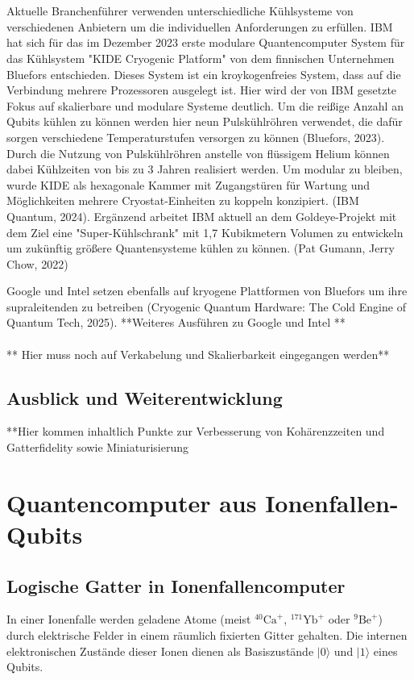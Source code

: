 \\\\
Aktuelle Branchenführer verwenden unterschiedliche Kühlsysteme von verschiedenen Anbietern um die individuellen Anforderungen zu erfüllen. IBM hat sich für das im Dezember 2023 erste modulare Quantencomputer System für das Kühlsystem "KIDE Cryogenic Platform" von dem finnischen Unternehmen Bluefors entschieden. Dieses System ist ein kroykogenfreies System, dass auf die Verbindung mehrere Prozessoren ausgelegt ist. Hier wird der von IBM gesetzte Fokus auf skalierbare und modulare Systeme deutlich. Um die reißige Anzahl an Qubits kühlen zu können werden hier neun Pulskühlröhren verwendet, die dafür sorgen verschiedene Temperaturstufen versorgen zu können (Bluefors, 2023). Durch die Nutzung von Pulskühlröhren anstelle von flüssigem Helium können dabei Kühlzeiten von bis zu 3 Jahren realisiert werden. Um modular zu bleiben, wurde KIDE als hexagonale Kammer mit Zugangstüren für Wartung und Möglichkeiten mehrere Cryostat-Einheiten zu koppeln konzipiert. (IBM Quantum, 2024). Ergänzend arbeitet IBM aktuell an dem Goldeye-Projekt mit dem Ziel eine "Super-Kühlschrank" mit 1,7 Kubikmetern Volumen zu entwickeln um zukünftig größere Quantensysteme kühlen zu können. (Pat Gumann, Jerry Chow, 2022) 

Google und Intel setzen ebenfalls auf kryogene Plattformen von Bluefors um ihre supraleitenden zu betreiben \cite{noauthor_cryogenic_2025}(Cryogenic Quantum Hardware: The Cold Engine of Quantum Tech, 2025). **Weiteres Ausführen zu Google und Intel **
\\\\
** Hier muss noch auf Verkabelung und Skalierbarkeit eingegangen werden**
\subsection{Ausblick und Weiterentwicklung}

**Hier kommen inhaltlich Punkte zur Verbesserung von Kohärenzzeiten und Gatterfidelity sowie Miniaturisierung

\section{Quantencomputer aus Ionenfallen-Qubits}
\subsection{Logische Gatter in Ionenfallencomputer}

In einer Ionenfalle werden geladene Atome (meist \( ^{40}\mathrm{Ca}^+ \), \( ^{171}\mathrm{Yb}^+ \) oder \( ^{9}\mathrm{Be}^+ \)) durch elektrische Felder in einem räumlich fixierten Gitter gehalten. Die internen elektronischen Zustände dieser Ionen dienen als Basiszustände \( \lvert 0 \rangle \) und \( \lvert 1 \rangle \) eines Qubits. 

